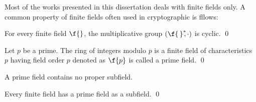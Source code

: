 Most of the works presented in this dissertation deals with  finite fields only. 
A common property of finite fields often used in cryptographic is fllows:
\begin{theorem}\label{Cyclic Group in Finite Field}
	For every finite field $\f{}$, the multiplicative group $({\f{\,}}^{\ast}\!\!, \cdot)$ is cyclic. 
	\qed
\end{theorem}
\begin{definition}
	Let $p$ be a prime. The ring of integers modulo $p$ is  a finite field of characteristics $p$ having field order $p$ denoted as $\f{p}$ is called a prime field.
	 \qed
\end{definition}
\begin{remark}
		A prime field contains no proper subfield.
\end{remark}

\begin{theorem}
	Every finite field has a prime field as a subfield. \qed
\end{theorem}

